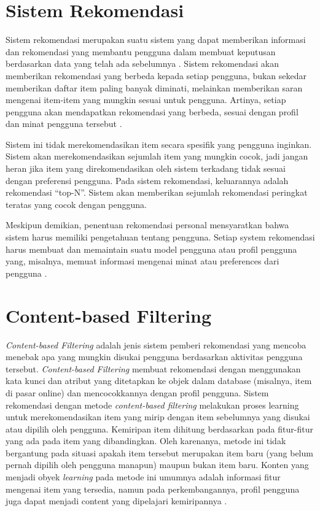 \section{Sistem Rekomendasi}
Sistem rekomendasi merupakan suatu sistem yang dapat memberikan informasi dan rekomendasi yang membantu pengguna dalam membuat keputusan berdasarkan data yang telah ada sebelumnya
\citep{clustering}. Sistem rekomendasi akan memberikan rekomendasi yang berbeda kepada setiap pengguna, bukan sekedar memberikan daftar item paling banyak diminati, melainkan memberikan
saran mengenai item-item yang mungkin sesuai untuk pengguna. Artinya, setiap pengguna akan mendapatkan rekomendasi yang berbeda, sesuai dengan profil dan minat
pengguna tersebut \citep{contentBasedXCollaborative}.

Sistem ini tidak merekomendasikan item secara spesifik yang pengguna inginkan. Sistem akan merekomendasikan sejumlah item yang mungkin cocok, jadi jangan heran jika
item yang direkomendasikan oleh sistem terkadang tidak sesuai dengan preferensi pengguna. Pada sistem rekomendasi, keluarannya adalah rekomendasi “top-N”. Sistem akan memberikan sejumlah
rekomendasi peringkat teratas yang cocok dengan pengguna.

Meskipun demikian, penentuan rekomendasi personal mensyaratkan bahwa sistem harus memiliki pengetahuan tentang pengguna. Setiap system rekomendasi harus membuat dan
memaintain suatu model pengguna atau profil pengguna yang, misalnya, memuat informasi mengenai minat atau preferences dari pengguna \citep{contentBasedXCollaborative}.

\section{Content-based Filtering}
\emph{Content-based Filtering} adalah jenis sistem pemberi rekomendasi yang mencoba menebak apa yang mungkin disukai pengguna berdasarkan aktivitas pengguna tersebut. \emph{Content-based Filtering}
membuat rekomendasi dengan menggunakan kata kunci dan atribut yang ditetapkan ke objek dalam database (misalnya, item di pasar online) dan mencocokkannya dengan profil pengguna.
Sistem rekomendasi dengan metode \emph{content-based filtering} melakukan proses learning untuk merekomendasikan item yang mirip dengan item sebelumnya
yang disukai atau dipilih oleh pengguna. Kemiripan item dihitung berdasarkan pada fitur-fitur yang ada pada item yang dibandingkan. Oleh karenanya, metode ini tidak bergantung
pada situasi apakah item tersebut merupakan item baru {(yang belum pernah dipilih oleh pengguna manapun)} maupun bukan item baru. Konten yang menjadi obyek \emph{learning} pada
metode ini umumnya adalah informasi fitur mengenai item yang tersedia, namun pada perkembangannya, profil pengguna juga dapat menjadi content yang dipelajari
kemiripannya \citep{contentBasedXCollaborative}.

